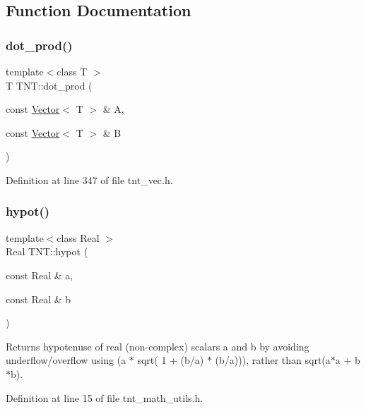\subsection{Function Documentation}
\mbox{\label{namespaceTNT_a3a98dd3afb32d1c69826da446eb2e995}} 
\subsubsection{\texorpdfstring{dot\+\_\+prod()}{dot\_prod()}}
{\footnotesize\ttfamily template$<$class T $>$ \\
T T\+N\+T\+::dot\+\_\+prod (\begin{DoxyParamCaption}\item[{const \hyperlink{classTNT_1_1Vector}{Vector}$<$ T $>$ \&}]{A,  }\item[{const \hyperlink{classTNT_1_1Vector}{Vector}$<$ T $>$ \&}]{B }\end{DoxyParamCaption})}



Definition at line 347 of file tnt\+\_\+vec.\+h.

\mbox{\label{namespaceTNT_ae102d1c8992a4fea1cc1b2efeabfcc66}} 
\subsubsection{\texorpdfstring{hypot()}{hypot()}}
{\footnotesize\ttfamily template$<$class Real $>$ \\
Real T\+N\+T\+::hypot (\begin{DoxyParamCaption}\item[{const Real \&}]{a,  }\item[{const Real \&}]{b }\end{DoxyParamCaption})}

\begin{DoxyReturn}{Returns}
hypotenuse of real (non-\/complex) scalars a and b by avoiding underflow/overflow using (a $\ast$ sqrt( 1 + (b/a) $\ast$ (b/a))), rather than sqrt(a$\ast$a + b$\ast$b). 
\end{DoxyReturn}


Definition at line 15 of file tnt\+\_\+math\+\_\+utils.\+h.

\mbox{\label{namespaceTNT_a4c23204963622fcd58b1f5e0753a9a96}} 
